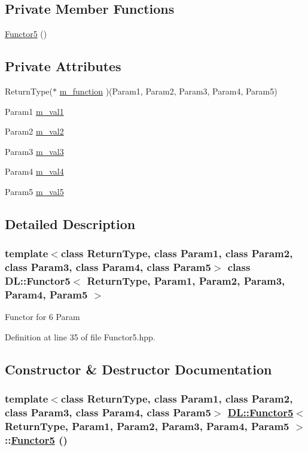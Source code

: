 \subsection*{Private Member Functions}
\begin{CompactItemize}
\item 
\hyperlink{classDL_1_1Functor5_d0}{Functor5} ()
\end{CompactItemize}
\subsection*{Private Attributes}
\begin{CompactItemize}
\item 
Return\-Type($\ast$ \hyperlink{classDL_1_1Functor5_r0}{m\_\-function} )(Param1, Param2, Param3, Param4, Param5)
\item 
Param1 \hyperlink{classDL_1_1Functor5_r1}{m\_\-val1}
\item 
Param2 \hyperlink{classDL_1_1Functor5_r2}{m\_\-val2}
\item 
Param3 \hyperlink{classDL_1_1Functor5_r3}{m\_\-val3}
\item 
Param4 \hyperlink{classDL_1_1Functor5_r4}{m\_\-val4}
\item 
Param5 \hyperlink{classDL_1_1Functor5_r5}{m\_\-val5}
\end{CompactItemize}


\subsection{Detailed Description}
\subsubsection*{template$<$class Return\-Type, class Param1, class Param2, class Param3, class Param4, class Param5$>$ class DL::Functor5$<$ Return\-Type, Param1, Param2, Param3, Param4, Param5 $>$}

Functor for 6 Param



Definition at line 35 of file Functor5.hpp.

\subsection{Constructor \& Destructor Documentation}
\hypertarget{classDL_1_1Functor5_d0}{
\subsubsection[Functor5]{\setlength{\rightskip}{0pt plus 5cm}template$<$class Return\-Type, class Param1, class Param2, class Param3, class Param4, class Param5$>$ \hyperlink{classDL_1_1Functor5}{DL::Functor5}$<$ Return\-Type, Param1, Param2, Param3, Param4, Param5 $>$::\hyperlink{classDL_1_1Functor5}{Functor5} ()}}
\label{classDL_1_1Functor5_d0}




